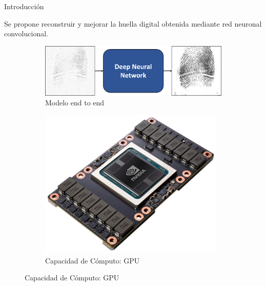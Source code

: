 \documentclass[12pt,aspectratio=169]{beamer}
\begin{document}
\begin{frame}{Introducción}

    Se propone reconstruir y mejorar la huella digital obtenida mediante red neuronal convolucional.
    \vspace{3mm}

    \begin{figure}
        \begin{subfigure}{0.58\textwidth}
            \centering
            \includegraphics[scale=0.34]{figs/end_to_end.png}
            \caption{Modelo end to end}
        \end{subfigure}
        \begin{subfigure}{0.38\textwidth}
            \centering
            \includegraphics[scale=0.28]{figs/nvidia_card.png}
            \caption{Capacidad de Cómputo: GPU}
        \end{subfigure}
    \end{figure}

\end{frame}
\end{document}
